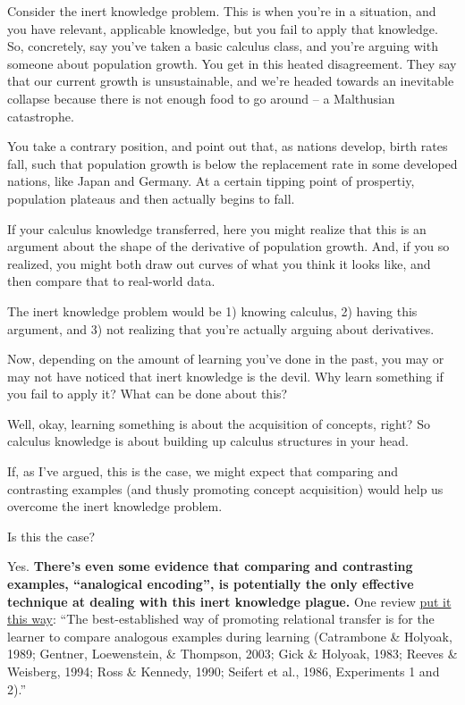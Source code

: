 Consider the inert knowledge problem. This is when you're in a
situation, and you have relevant, applicable knowledge, but you fail to
apply that knowledge. So, concretely, say you've taken a basic calculus
class, and you're arguing with someone about population growth. You get
in this heated disagreement. They say that our current growth is
unsustainable, and we're headed towards an inevitable collapse because
there is not enough food to go around -- a Malthusian catastrophe.

You take a contrary position, and point out that, as nations develop,
birth rates fall, such that population growth is below the replacement
rate in some developed nations, like Japan and Germany. At a certain
tipping point of prospertiy, population plateaus and then actually
begins to fall.

If your calculus knowledge transferred, here you might realize that this
is an argument about the shape of the derivative of population growth.
And, if you so realized, you might both draw out curves of what you
think it looks like, and then compare that to real-world data.

The inert knowledge problem would be 1) knowing calculus, 2) having this
argument, and 3) not realizing that you're actually arguing about
derivatives.

Now, depending on the amount of learning you've done in the past, you
may or may not have noticed that inert knowledge is the devil. Why learn
something if you fail to apply it? What can be done about this?

Well, okay, learning something is about the acquisition of concepts,
right? So calculus knowledge is about building up calculus structures in
your head.

If, as I've argued, this is the case, we might expect that comparing and
contrasting examples (and thusly promoting concept acquisition) would
help us overcome the inert knowledge problem.

Is this the case?

Yes. \textbf{There's even some evidence that comparing and contrasting
examples, ``analogical encoding'', is potentially the only effective
technique at dealing with this inert knowledge plague.} One review
\href{http://onlinelibrary.wiley.com/doi/10.1111/j.1551-6709.2009.01070.x/full}{put
it this way}: ``The best-established way of promoting relational
transfer is for the learner to compare analogous examples during
learning (Catrambone \& Holyoak, 1989; Gentner, Loewenstein, \&
Thompson, 2003; Gick \& Holyoak, 1983; Reeves \& Weisberg, 1994; Ross \&
Kennedy, 1990; Seifert et al., 1986, Experiments 1 and 2).''

